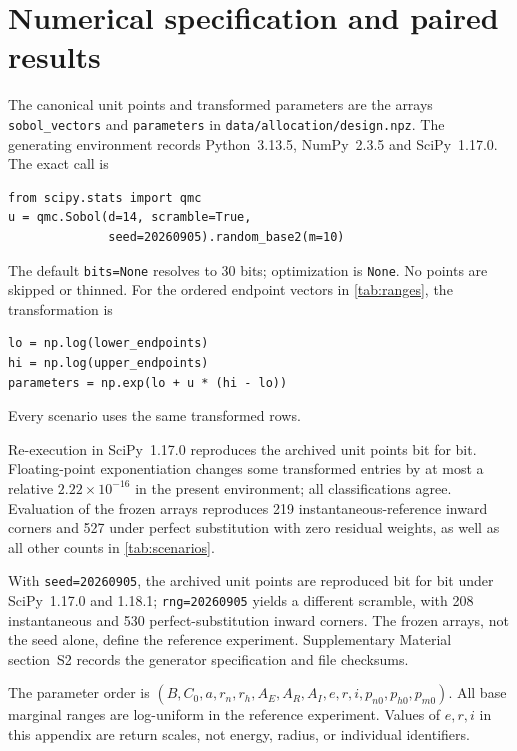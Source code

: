 \section{Numerical specification and paired results}
\label{app:numerical}

The canonical unit points and transformed parameters are the arrays
\texttt{sobol\_vectors} and \texttt{parameters} in
\texttt{data/allocation/design.npz}. The generating environment records
Python~3.13.5, NumPy~2.3.5 and SciPy~1.17.0. The exact call is
\begin{verbatim}
from scipy.stats import qmc
u = qmc.Sobol(d=14, scramble=True,
              seed=20260905).random_base2(m=10)
\end{verbatim}
The default \texttt{bits=None} resolves to 30 bits; optimization is
\texttt{None}. No points are skipped or thinned. For the ordered endpoint
vectors in \cref{tab:ranges}, the transformation is
\begin{verbatim}
lo = np.log(lower_endpoints)
hi = np.log(upper_endpoints)
parameters = np.exp(lo + u * (hi - lo))
\end{verbatim}
Every scenario uses the same transformed rows.

Re-execution in SciPy~1.17.0 reproduces the archived unit points bit for
bit. Floating-point exponentiation changes some transformed entries by
at most a relative $2.22\times10^{-16}$ in the present environment;
all classifications agree. Evaluation of the frozen arrays reproduces
219 instantaneous-reference inward corners and 527 under perfect
substitution with zero residual weights, as well as all other counts
in \cref{tab:scenarios}.

With \texttt{seed=20260905}, the archived unit points are reproduced
bit for bit under SciPy~1.17.0 and 1.18.1;
\texttt{rng=20260905} yields a different scramble, with 208
instantaneous and 530 perfect-substitution inward corners.
The frozen arrays, not the seed alone, define the reference experiment.
Supplementary Material section~S2 records the generator specification
and file checksums.

The parameter order is $(B,C_0,a,r_n,r_h,A_E,A_R,A_I,e,r,i,p_{n0},p_{h0},p_{m0})$. All base marginal ranges are log-uniform in the reference experiment. Values of $e,r,i$ in this appendix are return scales, not energy, radius, or individual identifiers.

